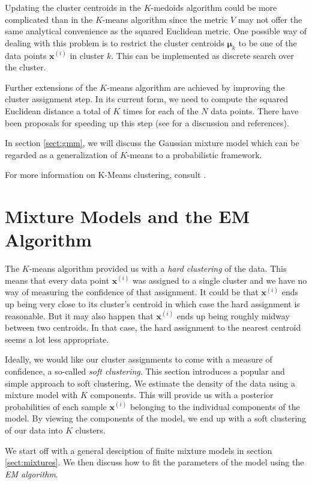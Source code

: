 \documentclass[final,3p,times,twocolumn]{elsarticle}
\let\bs\boldsymbol
\begin{document}
Updating the cluster centroids in the $K$-medoids algorithm could be more complicated than in the $K$-means algorithm since the metric $V$ may not offer the same analytical convenience as the squared Euclidean metric.
One possible way of dealing with this problem is to restrict the cluster centroids $\bs\mu_k$ to be one of the data points $\bs x^{(i)}$ in cluster $k$.
This can be implemented as discrete search over the cluster.

Further extensions of the $K$-means algorithm are achieved by improving the cluster assignment step.
In its current form, we need to compute the squared Euclidean distance a total of $K$ times for each of the $N$ data points.
There have been proposals for speeding up this step (see \cite{Bishop} for a discussion and references).

In section \ref{sect:gmm}, we will discuss the Gaussian mixture model which can be regarded as a generalization of $K$-means to a probabilistic framework.

For more information on K-Means clustering, consult \cite{Bishop,Murphy}.






\section{Mixture Models and the EM Algorithm}
\label{sect:fmm}
The $K$-means algorithm provided us with a \emph{hard clustering} of the data.
This means that every data point $\bs x^{(i)}$ was assigned to a single cluster and we have no way of measuring the confidence of that assignment.
It could be that $\bs x^{(i)}$ ends up being very close to its cluster's centroid in which case the hard assignment is reasonable.
But it may also happen that $\bs x^{(i)}$ ends up being roughly midway between two centroids.
In that case, the hard assignment to the nearest centroid seems a lot less appropriate.

Ideally, we would like our cluster assignments to come with a measure of confidence, a so-called \emph{soft clustering}.
This section introduces a popular and simple approach to soft clustering.
We estimate the density of the data using a mixture model with $K$ components.
This will provide us with a posterior probabilities of each sample $\bs x^{(i)}$ belonging to the individual components of the model.
By viewing the components of the model, we end up with a soft clustering of our data into $K$ clusters.

We start off with a general desciption of finite mixture models in section \ref{sect:mixtures}.
We then discuss how to fit the parameters of the model using the \emph{EM algorithm}.
\end{document}
